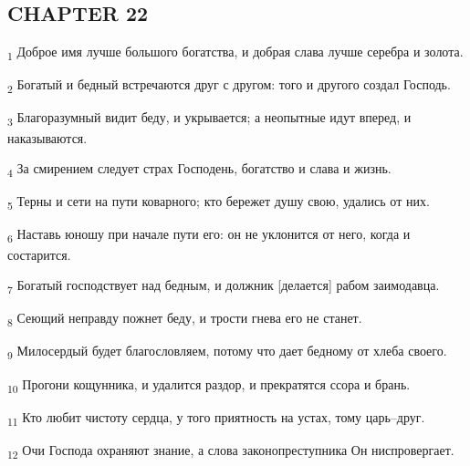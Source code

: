 \subsection{CHAPTER 22}
\begin{tcolorbox}
\textsubscript{1} Доброе имя лучше большого богатства, и добрая слава лучше серебра и золота.
\end{tcolorbox}
\begin{tcolorbox}
\textsubscript{2} Богатый и бедный встречаются друг с другом: того и другого создал Господь.
\end{tcolorbox}
\begin{tcolorbox}
\textsubscript{3} Благоразумный видит беду, и укрывается; а неопытные идут вперед, и наказываются.
\end{tcolorbox}
\begin{tcolorbox}
\textsubscript{4} За смирением следует страх Господень, богатство и слава и жизнь.
\end{tcolorbox}
\begin{tcolorbox}
\textsubscript{5} Терны и сети на пути коварного; кто бережет душу свою, удались от них.
\end{tcolorbox}
\begin{tcolorbox}
\textsubscript{6} Наставь юношу при начале пути его: он не уклонится от него, когда и состарится.
\end{tcolorbox}
\begin{tcolorbox}
\textsubscript{7} Богатый господствует над бедным, и должник [делается] рабом заимодавца.
\end{tcolorbox}
\begin{tcolorbox}
\textsubscript{8} Сеющий неправду пожнет беду, и трости гнева его не станет.
\end{tcolorbox}
\begin{tcolorbox}
\textsubscript{9} Милосердый будет благословляем, потому что дает бедному от хлеба своего.
\end{tcolorbox}
\begin{tcolorbox}
\textsubscript{10} Прогони кощунника, и удалится раздор, и прекратятся ссора и брань.
\end{tcolorbox}
\begin{tcolorbox}
\textsubscript{11} Кто любит чистоту сердца, у того приятность на устах, тому царь--друг.
\end{tcolorbox}
\begin{tcolorbox}
\textsubscript{12} Очи Господа охраняют знание, а слова законопреступника Он ниспровергает.
\end{tcolorbox}
